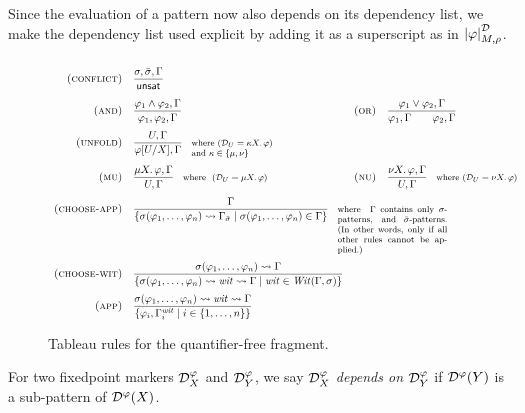 Since the evaluation of a pattern now also depends on its dependency list,
we make the dependency list used explicit by adding it as a superscript as in \(\left| {\varphi} \right|^\mathcal D_{M,\rho}\).

\begin{figure*}
\footnotesize
$$\def\arraystretch{2.5}\begin{array}{rlrl}
\prule{conflict}
& \pruleun{\sigma,\bar\sigma,\Gamma}
  { \unsat }
\\
\prule{and} 
& \pruleun{\phi_1 \wedge \phi_2,\Gamma}
                {\phi_1,\phi_2,\Gamma}
&\prule{or}
& \prulebin{\phi_1 \vee \phi_2, \Gamma}
                 {\phi_1,\Gamma}
                 {\phi_2,\Gamma}
\\
\prule{unfold}
&
\multicolumn{3}{l} {
 \pruleun{U, \Gamma}
                {\phi[U/X], \Gamma}
\where{$(\deflist_U = \kappa X \ldotp \phi)$ \\
         and $\kappa \in \{\mu,\nu\}$}
} \\
\prule{mu}
& \pruleun{\mu X \ldotp \phi, \Gamma}{U,\Gamma}
\where{ $(\deflist_U = \mu X \ldotp \phi)$}

&\prule{nu}
&  \pruleun{\nu X \ldotp \phi, \Gamma}{U,\Gamma}
\where{$(\deflist_U = \nu X \ldotp \phi)$}
\\
\appa
& \multicolumn{3}{l} {
\pruleun {\Gamma}
                 {\left\{ \sigma(\phi_1,\dots,\phi_n) \leadsto \Gamma_{\bar\sigma}
                  \mid \sigma(\phi_1,\dots,\phi_n) \in \Gamma
                  \right\} }
                 {
                 \where{
                    $\Gamma$ contains only
                    $\sigma$-patterns, and $\bar\sigma$-patterns.
                    (In other words, only if all other rules cannot be applied.)
                 }
                 }
}
\\
\appb
&
\pruleun{\sigma(\phi_1,\dots,\phi_n) \leadsto \Gamma }
        {\left\{ \sigma(\phi_1,\dots,\phi_n) \leadsto \wit \leadsto \Gamma \mid \wit \in 
         \Wit(\Gamma,\sigma) \right\}}
\\
\appc
& \pruleun{\sigma(\phi_1,\dots,\phi_n) \leadsto \wit \leadsto \Gamma}
{\left\{ \phi_i, \Gamma^\wit_i \mid i \in \{1,\dots,n\} \right\}}
\end{array}$$
\caption{Tableau rules for the quantifier-free fragment.}
\label{fig:qf-tableau}
\end{figure*}

\begin{definition}[Depends On]For two fixedpoint markers \(\mathcal D^\varphi_X\) and \(\mathcal D^\varphi_Y\),
we say \(\mathcal D^\varphi_X\) \emph{depends on} \(\mathcal D^\varphi_Y\)
if \(\mathcal D^\varphi(Y)\) is a sub-pattern of \(\mathcal D^\varphi(X)\).\end{definition}

